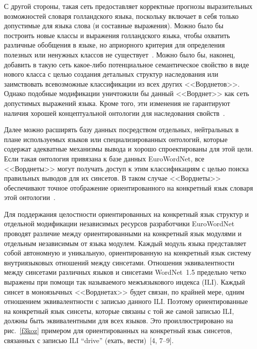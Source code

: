 \begin{multicols}{2}
     С другой стороны, такая сеть предоставляет корректные прогнозы 
выразительных возможностей словаря голландского языка, поскольку 
включает в себя только допустимые для языка слова (и составные выражения). 
Можно было бы построить новые классы и выражения голландского языка, 
чтобы охватить различные обобщения в языке, но априорного критерия для 
определения полезных или ненужных классов не существует~\cite{4koz}. 
Можно было бы, наконец, добавить в такую сеть какое-либо потенциальное 
семантическое свойство в виде нового класса с целью создания детальных 
структур наследования или  заимствовать всевозможные классификации из 
всех других <<Ворднетов>>. Однако подобные модификации уничтожили бы 
данный <<Ворднет>> как сеть допустимых выражений языка. Кроме того, эти 
изменения не гарантируют наличия хорошей концептуальной онтологии для 
наследования свойств~\cite{4koz}. 
     
     Далее можно расширять базу данных посредством отдельных, 
нейтральных в плане используемых языков или специализированных 
онтологий, которые содержат адекватные механизмы вывода и хорошо 
спроектированы для этой цели. Если такая онтология привязана к базе данных 
EuroWordNet, все <<Ворднеты>> могут получать доступ к этим 
классификациям с целью поиска правильных выводов для их синсетов. В 
таком случае <<Ворднеты>> обеспечивают точное отображение 
ориентированного на конкретный язык словаря этой онтологии~\cite{4koz, 
8koz}. 
{

}
     
     Для поддержания целостности ориентированных на конкретный язык 
структур и отдельной модификации независимых ресурсов разработчики 
EuroWordNet проводят различие между ориентированными на конкретный 
язык модулями и отдель\-ным независимым от языка модулем.  Каж\-дый \mbox{модуль} 
языка представляет собой автономную и %
уникальную, ориентированную на 
конкретный язык систему внутриязыковых отношений между синсетами. 
Отношения эквивалентности между синсетами различных языков и синсетами 
WordNet~1.5 предельно четко выражены при помощи так называемого 
межъязыкового индекса (ILI). %
Каж\-дый синсет в 
моноязычных <<Ворднетах>> будет \mbox{связан,} по крайней мере, одним 
отношением эквивалентности с записью данного ILI. Поэтому 
ориентированные на конкретный язык синсеты, которые связаны с той же 
самой записью ILI, должны быть эквивалентными для всех языков. Это 
проиллюстрировано на рис.~\ref{f3koz} примером для ориентированных на 
конкретный язык синсетов, связанных с записью ILI ``drive'' (ехать, 
вести)~[4, 7--9]. 
     

\end{multicols}
